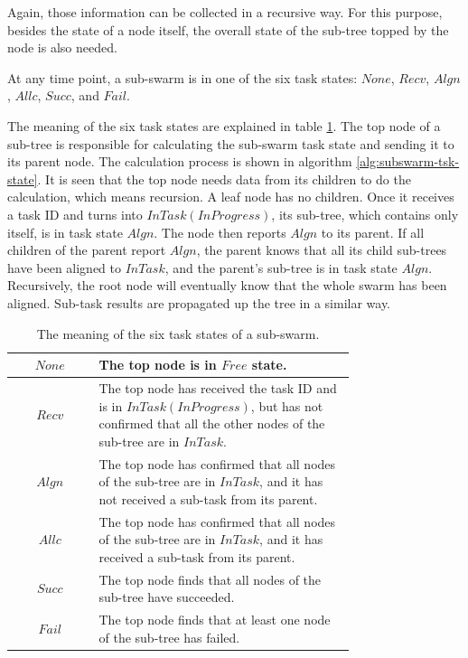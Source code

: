 Again, those information can be collected in a recursive way.
For this purpose, besides the state of a node itself,
the overall state of the sub-tree topped by the node is also needed.
\begin{remark}
    At any time point, a sub-swarm is in one of the six task states:
    $None$, $Recv$, $Algn$, $Allc$, $Succ$, and $Fail$.
\end{remark}
The meaning of the six task states are explained in table \ref{tbl:subswm_tsk_state}.
The top node of a sub-tree is responsible for
calculating the sub-swarm task state and sending it to its parent node.
The calculation process is shown in algorithm \ref{alg:subswarm-tsk-state}.
It is seen that the top node needs data from its children to do the calculation,
which means recursion.
A leaf node has no children.
Once it receives a task ID and turns into $InTask(InProgress)$,
its sub-tree, which contains only itself, is in task state $Algn$.
The node then reports $Algn$ to its parent.
If all children of the parent report $Algn$,
the parent knows that all its child sub-trees have been aligned to $InTask$,
and the parent's sub-tree is in task state $Algn$.
Recursively, the root node will eventually know that the whole swarm has been aligned.
Sub-task results are propagated up the tree in a similar way.

\begin{table}[htbp]
\centering
\caption[Sub-swarm task states.]
{The meaning of the six task states of a sub-swarm.}
\label{tbl:subswm_tsk_state}
\begin{tabular}{c|p{0.75\linewidth}}
  \hline
  $None$ & The top node is in $Free$ state. \\
  \hline
  $Recv$ & The top node has received the task ID and is in $InTask(InProgress)$,
           but has not confirmed that all the other nodes of the sub-tree are in $InTask$. \\
  \hline
  $Algn$ & The top node has confirmed that all nodes of the sub-tree are in $InTask$,
           and it has not received a sub-task from its parent. \\
  \hline
  $Allc$ & The top node has confirmed that all nodes of the sub-tree are in $InTask$,
           and it has received a sub-task from its parent. \\
  \hline
  $Succ$ & The top node finds that all nodes of the sub-tree have succeeded. \\
  \hline
  $Fail$ & The top node finds that at least one node of the sub-tree has failed. \\
  \hline
\end{tabular}
\end{table}

